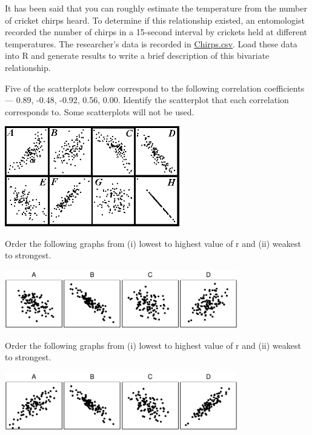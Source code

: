 \documentclass[10pt,openany]{book}\usepackage[]{graphicx}\usepackage[]{color}
\begin{document}
\begin{exsection}
  \item \label{revex:qbEDACrckt} \rhw{} It has been said that you can roughly estimate the temperature from the number of cricket chirps heard.  To determine if this relationship existed, an entomologist recorded the number of chirps in a 15-second interval by crickets held at different temperatures.  The researcher's data is recorded in \href{https://raw.githubusercontent.com/droglenc/NCData/master/Chirps.csv}{Chirps.csv}.  Load these data into R and generate results to write a brief description of this bivariate relationship. 

  \item \label{revex:qbEDArChos1} Five of the scatterplots below correspond to the following correlation coefficients --- 0.89, -0.48, -0.92, 0.56, 0.00. Identify the scatterplot that each correlation corresponds to. Some scatterplots will not be used. 
\begin{center}
  \includegraphics[width=3in]{Figs/r_chos1.png}
\end{center}

  \item \label{revex:qbEDArChos2} Order the following graphs from (i) lowest to highest value of r and (ii) weakest to strongest.  

\begin{center}
  \includegraphics[width=4in]{Figs/RChoose1-1}
\end{center}

  \item \label{revex:qbEDArChos3} Order the following graphs from (i) lowest to highest value of r and (ii) weakest to strongest. 

\begin{center}
  \includegraphics[width=4in]{Figs/RChoose2-1}
\end{center}
\end{exsection}
\end{document}
